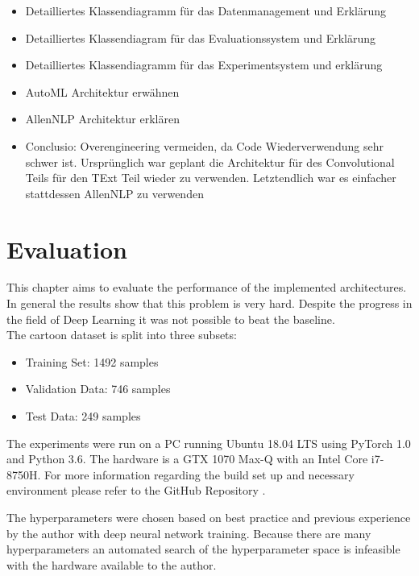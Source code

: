 \documentclass[draft,final,oneside]{vutinfth} %
\begin{document}
\begin{itemize}

\item Detailliertes Klassendiagramm für das Datenmanagement und Erklärung
\item Detailliertes Klassendiagram für das Evaluationssystem und Erklärung
\item Detailliertes Klassendiagramm für das Experimentsystem und erklärung 
\item AutoML Architektur erwähnen
\item AllenNLP Architektur erklären
\item Conclusio: Overengineering vermeiden, da Code Wiederverwendung sehr schwer ist. Ursprünglich war geplant die Architektur für des Convolutional Teils für den TExt Teil wieder zu verwenden. Letztendlich war es einfacher stattdessen AllenNLP zu verwenden

\end{itemize}

\fi


\chapter{Evaluation} \label{evaluationchapter}

This chapter aims to evaluate the performance of the implemented architectures. In
general the results show that this problem is very hard. Despite the progress in the field of Deep Learning it was not possible to beat the baseline. \\

The cartoon dataset is split into three subsets:

\begin{itemize}
\item Training Set: 1492 samples %
\item Validation Data: 746 samples %
\item Test Data: 249 samples %
\end{itemize}

The experiments were run on a PC running Ubuntu 18.04 LTS using PyTorch 1.0 and
Python 3.6. The hardware is a GTX 1070 Max-Q with an Intel Core i7-8750H. For more
information regarding the build set up and necessary environment please refer to the GitHub Repository \cite{deephumorrepo}.

The hyperparameters were chosen based on best practice and previous
experience by the author with deep neural network training. Because there are many hyperparameters an automated search of the hyperparameter space is infeasible with the hardware available to the author.
\end{document}
